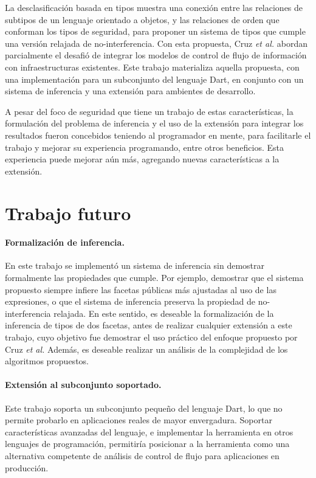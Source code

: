 \begin{conclusion}

	La desclasificación basada en tipos muestra una conexión entre las relaciones de subtipos de un lenguaje orientado a objetos, y las relaciones de orden que conforman los tipos de seguridad, para proponer un sistema de tipos que cumple una versión relajada de no-interferencia. Con esta propuesta, Cruz \textit{et al.} abordan parcialmente el desafió de integrar los modelos de control de flujo de información con infraestructuras existentes. Este trabajo materializa aquella propuesta, con una implementación para un subconjunto del lenguaje Dart, en conjunto con un sistema de inferencia y una extensión para ambientes de desarrollo.

	A pesar del foco de seguridad que tiene un trabajo de estas características, la formulación del problema de inferencia y el uso de la extensión para integrar los resultados fueron concebidos teniendo al programador en mente, para facilitarle el trabajo y mejorar su experiencia programando, entre otros beneficios. Esta experiencia puede mejorar aún más, agregando nuevas características a la extensión.

	\section*{Trabajo futuro}

	\paragraph{Formalización de inferencia.}En este trabajo se implementó un sistema de inferencia sin demostrar formalmente las propiedades que cumple. Por ejemplo, demostrar que el sistema propuesto siempre infiere las facetas públicas más ajustadas al uso de las expresiones, o que el sistema de inferencia preserva la propiedad de no-interferencia relajada. En este sentido, es deseable la formalización de la inferencia de tipos de dos facetas, antes de realizar cualquier extensión a este trabajo, cuyo objetivo fue demostrar el uso práctico del enfoque propuesto por Cruz \textit{et al.} Además, es deseable realizar un análisis de la complejidad de los algoritmos propuestos.

	\paragraph{Extensión al subconjunto soportado.}Este trabajo soporta un subconjunto pequeño del lenguaje Dart, lo que no permite probarlo en aplicaciones reales de mayor envergadura. Soportar características avanzadas del lenguaje, e implementar la herramienta en otros lenguajes de programación, permitiría posicionar a la herramienta como una alternativa competente de análisis de control de flujo para aplicaciones en producción.


\end{conclusion}
